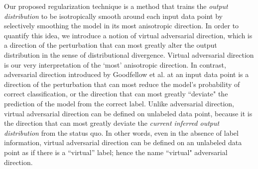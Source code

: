 \documentclass[10pt,journal,compsoc]{IEEEtran}
\newcommand\mnote[1]{\textcolor{blue}{(MIYATO: #1)}}
\newcommand\iwrite[1]{\textcolor{red}{Meada: #1}}
\newcommand\new[1]{\textcolor{blue}{#1}}
\begin{document}
Our proposed regularization technique is a method that trains the \textit{output distribution} to be isotropically smooth around each input data point by selectively smoothing the model in its most anisotropic direction.
In order to quantify this idea, we introduce a notion of virtual adversarial direction, which is a direction of the perturbation that can most greatly alter the output distribution in the sense of distributional divergence. Virtual adversarial direction is our very interpretation of the `most' anisotropic direction.
In contrast, adversarial direction introduced by Goodfellow et al. \cite{goodfellow2014explaining} at an input data point is a direction of the perturbation that can most reduce the model's probability of correct classification, or the direction that can most greatly ``deviate" the prediction of the model from the correct label.
Unlike adversarial direction, virtual adversarial direction can be defined on unlabeled data point, because it is the direction that can most greatly deviate the \textit{current inferred output distribution} from the status quo.
In other words, even in the absence of label information, virtual adversarial direction can be defined on an unlabeled data point as if there is a ``virtual'' label; hence the name ``virtual" adversarial direction.
\end{document}
